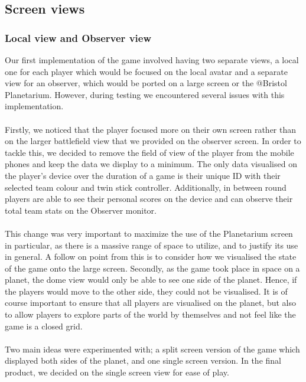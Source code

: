 \documentclass[11pt,a4paper]{article}
\begin{document}
\subsection{Screen views}


   \subsubsection{Local view and Observer view}

   Our first implementation of the game involved having two separate views, a local one for each player which would be focused on the local avatar and a separate view for an observer, which would be ported on a large screen or the @Bristol Planetarium. However, during testing we encountered several issues with this implementation. \\ \\
   Firstly, we noticed that the player focused more on their own screen rather than on the larger battlefield view that we provided on the observer screen. In order to tackle this, we decided to remove the field of view of the player from the mobile phones and keep the data we display to a minimum. The only data visualised on the player’s device over the duration of a game is their unique ID with their selected team colour and twin stick controller. Additionally, in between round players are able to see their personal scores on the device and can observe their total team stats on the Observer monitor. \\ \\
   This change was very important to maximize the use of the Planetarium screen in particular, as there is a massive range of space to utilize, and to justify its use in general. A follow on point from this is to consider how we visualised the state of the game onto the large screen. 
   Secondly, as the game took place in space on a planet, the dome view would only be able to see one side of the planet. Hence, if the players would move to the other side, they could not be visualised. It is of course important to ensure that all players are visualised on the planet, but also to allow players to explore parts of the world by themselves and not feel like the game is a closed grid. \\ \\  
   Two main ideas were experimented with; a split screen version of the game which displayed both sides of the planet, and one single screen version. In the final product, we decided on the single screen view for ease of play.
\end{document}
